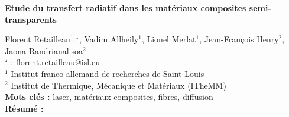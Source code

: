 


    \newpage


%
\begin{flushleft}
\addtocounter{section}{1}
{\Large \textbf{Etude du transfert radiatif dans les matériaux composites semi-transparents}}\label{ref:69}
\end{flushleft}
%
Florent Retailleau$^{1,\star}$, Vadim Allheily$^{1}$, Lionel Merlat$^{1}$, Jean-François Henry$^{2}$, Jaona Randrianalisoa$^{2}$\\[2mm]
$^{\star}$ \Letter : \url{florent.retailleau@isl.eu}\\[2mm]
{\footnotesize $^{1}$ Institut franco-allemand de recherches de Saint-Louis}\\
{\footnotesize $^{2}$ Institut de Thermique, Mécanique et Matériaux (ITheMM)}\\
[4mm]
%
\noindent \textbf{Mots clés : } laser, matériaux composites, fibres, diffusion\\[4mm]
%
\noindent \textbf{Résumé : } 

